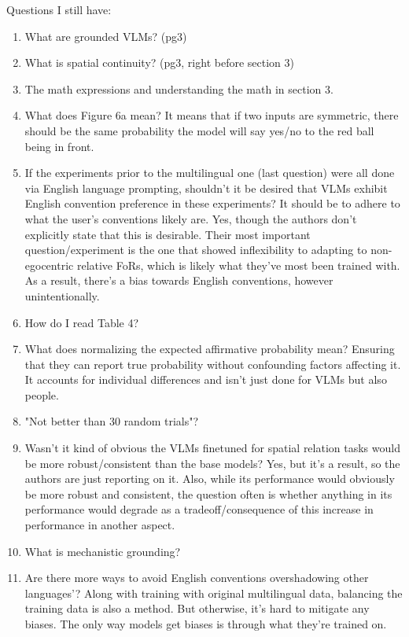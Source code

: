 \documentclass[12pt, letterpaper]{article}
\begin{document}
\begin{spacing}{1.10}
\noindent Questions I still have:
\begin{enumerate}
    \item What are grounded VLMs? (pg3)
    \item What is spatial continuity? (pg3, right before section 3)
    \item The math expressions and understanding the math in section 3.
    \item What does Figure 6a mean?
        It means that if two inputs are symmetric, there should be the same probability the model will say yes/no to the red ball being in front. 
    \item If the experiments prior to the multilingual one (last question) were all done via English language prompting, shouldn't it be desired that VLMs exhibit English convention preference in these experiments? It should be to adhere to what the user's conventions likely are.
        Yes, though the authors don't explicitly state that this is desirable. Their most important question/experiment is the one that showed inflexibility to adapting to non-egocentric relative FoRs, which is likely what they've most been trained with. As a result, there's a bias towards English conventions, however unintentionally.
    \item How do I read Table 4?
    \item What does normalizing the expected affirmative probability mean?
        Ensuring that they can report true probability without confounding factors affecting it. It accounts for individual differences and isn't just done for VLMs but also people.
    \item "Not better than 30 random trials"?
    \item Wasn't it kind of obvious the VLMs finetuned for spatial relation tasks would be more robust/consistent than the base models?
        Yes, but it's a result, so the authors are just reporting on it. Also, while its performance would obviously be more robust and consistent, the question often is whether anything in its performance would degrade as a tradeoff/consequence of this increase in performance in another aspect.
    \item What is mechanistic grounding?
    \item Are there more ways to avoid English conventions overshadowing other languages'?
        Along with training with original multilingual data, balancing the training data is also a method. But otherwise, it's hard to mitigate any biases. The only way models get biases is through what they're trained on.
\end{enumerate}


\end{spacing}
\end{document}

